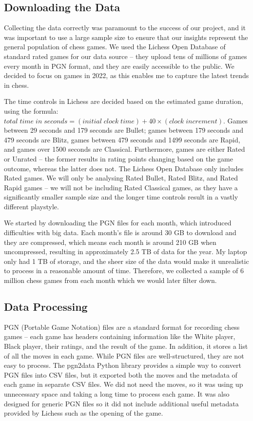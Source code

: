 \documentclass[a4paper, 11pt]{article}
\begin{document}
\subsection{Downloading the Data}
Collecting the data correctly was paramount to the success of our project, and it was important to use a large sample size to ensure that our insights represent the general population of chess games. We used the Lichess Open Database \cite{lichessOpenDatabase} of standard rated games for our data source -- they upload tens of millions of games every month in PGN format, and they are easily accessible to the public. We decided to focus on games in 2022, as this enables me to capture the latest trends in chess.

The time controls in Lichess are decided based on the estimated game duration, using the formula: $total \; time \; in \; seconds = (initial \; clock \; time) + 40 \times (clock \; increment)$. Games between 29 seconds and 179 seconds are Bullet; games between 179 seconds and 479 seconds are Blitz, games between 479 seconds and 1499 seconds are Rapid, and games over 1500 seconds are Classical. Furthermore, games are either Rated or Unrated -- the former results in rating points changing based on the game outcome, whereas the latter does not. The Lichess Open Database only includes Rated games. We will only be analysing Rated Bullet, Rated Blitz, and Rated Rapid games -- we will not be including Rated Classical games, as they have a significantly smaller sample size and the longer time controls result in a vastly different playstyle.

We started by downloading the PGN files for each month, which introduced difficulties with big data. Each month's file is around 30 GB to download and they are compressed, which means each month is around 210 GB when uncompressed, resulting in approximately 2.5 TB of data for the year. My laptop only had 1 TB of storage, and the sheer size of the data would make it unrealistic to process in a reasonable amount of time. Therefore, we collected a sample of 6 million chess games from each month which we would later filter down.

\subsection{Data Processing}
PGN (Portable Game Notation) files are a standard format for recording chess games -- each game has headers containing information like the White player, Black player, their ratings, and the result of the game. In addition, it stores a list of all the moves in each game. While PGN files are well-structured, they are not easy to process. The pgn2data Python library \cite{pgn2dataGitHub} provides a simple way to convert PGN files into CSV files, but it exported both the moves and the metadata of each game in separate CSV files. We did not need the moves, so it was using up unnecessary space and taking a long time to process each game. It was also designed for generic PGN files so it did not include additional useful metadata provided by Lichess such as the opening of the game.
\end{document}
